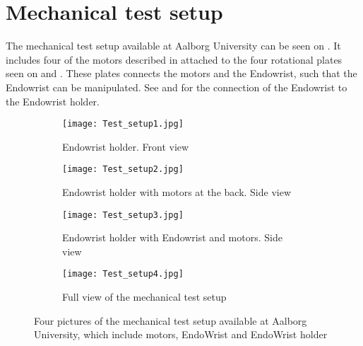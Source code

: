 \section{Mechanical test setup}\label{sec:Mechanical_testsetup.tex}
The mechanical test setup available at Aalborg University can be seen on . It includes four of the motors described in  attached to the four rotational plates seen on  and . These plates connects the motors and the Endowrist, such that the Endowrist can be manipulated. See  and  for the connection of the Endowrist to the Endowrist holder.  

\begin{figure}[H]
	\centering
	\begin{minipage}[t]{0.9\textwidth}
	\begin{subfigure}{0.45\textwidth}
		\vspace{-10pt}
		\centering
		\texttt{[image: Test\_setup1.jpg]}
		\caption{Endowrist holder. Front view}
		\label{fig:Mec_a}
	\end{subfigure}
	\hspace{\fill}
	\begin{subfigure}{0.45\textwidth}
		\centering
		\texttt{[image: Test\_setup2.jpg]}
		\caption{Endowrist holder with motors at the back. Side view}
		\label{fig:Mec_b}
	\end{subfigure}
	\end{minipage}

	\begin{minipage}[t]{0.9\textwidth}
	\vspace{20pt}
	\begin{subfigure}{0.45\textwidth}
		\vspace{0pt}
		\centering
		\texttt{[image: Test\_setup3.jpg]}
		\caption{Endowrist holder with Endowrist and motors. Side view}
		\label{fig:Mec_c}
	\end{subfigure}
	\hspace{\fill}
	\begin{subfigure}{0.45\textwidth}
		\centering
		\texttt{[image: Test\_setup4.jpg]}
		\caption{Full view of the mechanical test setup}
		\label{fig:Mec_d}
	\end{subfigure}
	\end{minipage}

	\caption{Four pictures of the mechanical test setup available at Aalborg University, which include motors, EndoWrist and EndoWrist holder}
	\label{fig:Mec_abcd}
\end{figure}